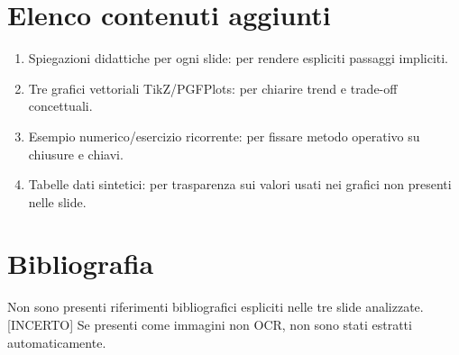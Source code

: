 \documentclass[11pt]{article}
\begin{document}
\section{Elenco contenuti aggiunti}
\begin{enumerate}[leftmargin=*]
\item [AGGIUNTA] Spiegazioni didattiche per ogni slide: per rendere espliciti passaggi impliciti.
\item [AGGIUNTA] Tre grafici vettoriali TikZ/PGFPlots: per chiarire trend e trade-off concettuali.
\item [AGGIUNTA] Esempio numerico/esercizio ricorrente: per fissare metodo operativo su chiusure e chiavi.
\item [AGGIUNTA] Tabelle dati sintetici: per trasparenza sui valori usati nei grafici non presenti nelle slide.
\end{enumerate}
\section{Bibliografia}
Non sono presenti riferimenti bibliografici espliciti nelle tre slide analizzate. [INCERTO] Se presenti come immagini non OCR, non sono stati estratti automaticamente.
\end{document}
